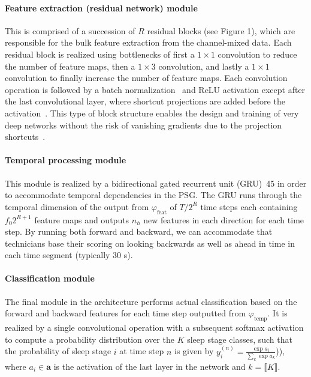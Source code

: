 \paragraph{Feature extraction (residual network) module}
This is comprised of a succession of $R$ residual blocks (see Figure 1), which are responsible for the bulk feature extraction from the channel-mixed data.
Each residual block is realized using bottlenecks of first a $1\times 1$ convolution to reduce the number of feature maps, then a $1\times 3$ convolution, and lastly a $1 \times 1$ convolution to finally increase the number of feature maps. 
Each convolution operation is followed by a batch normalization~\cite{Ioffe2015} and ReLU activation except after the last convolutional layer, where shortcut projections are added before the activation~\cite{He2016b}.
This type of block structure enables the design and training of very deep networks without the risk of vanishing gradients due to the projection shortcuts~\cite{He2016}.

\paragraph{Temporal processing module}
This module is realized by a bidirectional gated recurrent unit (GRU)~\cite{Cho}45 in order to accommodate temporal dependencies in the PSG.
The GRU runs through the temporal dimension of the output from $\varphi_{\mathrm{feat}}$ of $T/2^R$ time steps each containing $f_0 2^{R+1}$ feature maps and outputs $n_h$ new features in each direction for each time step.
By running both forward and backward, we can accommodate that technicians base their scoring on looking backwards as well as ahead in time in each time segment (typically 30 s).

\paragraph{Classification module}
The final module in the architecture performs actual classification based on the forward and backward features for each time step outputted from $\varphi_{\mathrm{temp}}$.
It is realized by a single convolutional operation with a subsequent softmax activation to compute a probability distribution over the $K$ sleep stage classes, such that the probability of sleep stage $i$ at time step $n$ is given by $y_i^{(n)} = \frac{\exp{a_i}}{\sum_k{\exp{a_k}}}$)), where $a_i \in \mathbf{a}$ is the activation of the last layer in the network and $k=\llbracket K \rrbracket$.



